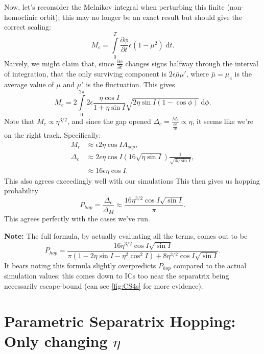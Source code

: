 \documentclass[11pt,
        usenames, %
        dvipsnames %
    ]{article}
\newcommand*{\pd}[2]{\frac{\partial#1}{\partial#2}}
\newcommand*{\p}[1]{\left(#1\right)}
\begin{document}
Now, let's reconsider the Melnikov integral when perturbing this finite
(non-homoclinic orbit); this may no longer be an exact result but should give
the correct scaling:
\begin{equation}
    M_c = \int\limits_0^T \pd{\phi}{t}\epsilon \p{1 - \mu^2}\;\mathrm{d}t.
\end{equation}
Naively, we might claim that, since $\pd{\phi}{t}$ changes signs halfway through
the interval of integration, that the only surviving component is $2\epsilon
\bar{\mu}\mu'$, where $\bar{\mu} = \mu_4$ is the average value of $\mu$ and
$\mu'$ is the fluctuation. This gives
\begin{equation}
    M_c = 2\int\limits_0^{2\pi}2\epsilon \frac{\eta \cos I}{1 + \eta \sin I}
        \sqrt{2\eta \sin I \p{1 - \cos \phi}}\;\mathrm{d}\phi.
\end{equation}
Note that $M_c \propto \eta^{3/2}$, and since the gap opened $\Delta_c =
\frac{M_c}{\pd{\phi}{t}} \propto \eta$, it seems like we're on the right track.
Specifically:
\begin{align}
    M_c &\approx \epsilon 2\eta \cos I A_{sep},\\
    \Delta_c &\approx 2\epsilon \eta \cos I \p{16 \sqrt{\eta \sin I}}
        \frac{1}{\sqrt{4\eta \sin I}},\\
        &\approx 16\epsilon \eta \cos I.
\end{align}
This also agrees exceedingly well with our simulations This then gives us
hopping probability
\begin{equation}
    P_{hop} = \frac{\Delta_c}{\Delta_M} \approx
        \frac{16\eta^{3/2}\cos I \sqrt{\sin I}}{\pi}.
\end{equation}
This agrees perfectly with the cases we've run.

\textbf{Note:} The full formula, by actually evaluating all the terms, comes out
to be
\begin{equation}
    P_{hop} = \frac{16\eta^{3/2}\cos I \sqrt{\sin I}}{\pi
        \p{1 - 2\eta \sin I - \eta^2 \cos^2 I}
        + 8\eta^{3/2}\cos I \sqrt{\sin I}}.
\end{equation}
It bears noting this formula slightly overpredicts $P_{hop}$ compared to the
actual simulation values; this comes down to ICs too near the separatrix being
necessarily escape-bound (can see \autoref{fig:CS4s} for more evidence).

\section{Parametric Separatrix Hopping: Only changing $\eta$}\label{s:p2}
\end{document}
